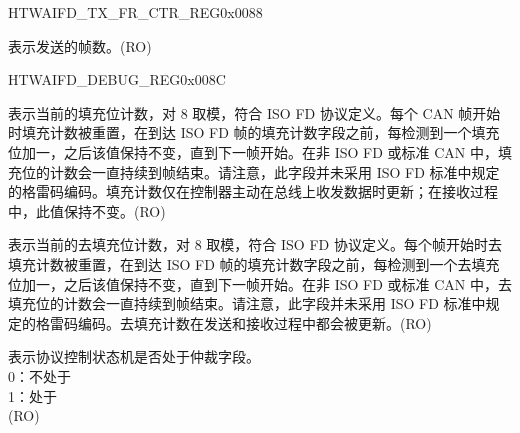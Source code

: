 \begin{register}{H}{TWAIFD\_TX\_FR\_CTR\_REG}{0x0088}\label{regdesc:TWAIFDTXFRCTRREG}
%
\regnewline%
\begin{regdesc}\begin{reglist}
\label{fielddesc:TWAIFDTXCTRVAL}\item [TWAIFD\_TX\_CTR\_VAL] 表示发送的帧数。(RO)
\end{reglist}\end{regdesc}
\end{register}


\begin{register}{H}{TWAIFD\_DEBUG\_REG}{0x008C}\label{regdesc:TWAIFDDEBUGREG}
%
%
%
%
%
%
%
%
%
%
%
%
%
%
%
%
\regnewline%
\begin{regdesc}\begin{reglist}
\label{fielddesc:TWAIFDSTUFFCOUNT}\item [TWAIFD\_STUFF\_COUNT] 表示当前的填充位计数，对 8 取模，符合 ISO FD 协议定义。每个 CAN 帧开始时填充计数被重置，在到达 ISO FD 帧的填充计数字段之前，每检测到一个填充位加一，之后该值保持不变，直到下一帧开始。在非 ISO FD 或标准 CAN 中，填充位的计数会一直持续到帧结束。请注意，此字段并未采用 ISO FD 标准中规定的格雷码编码。填充计数仅在控制器主动在总线上收发数据时更新；在接收过程中，此值保持不变。(RO)
\label{fielddesc:TWAIFDDESTUFFCOUNT}\item [TWAIFD\_DESTUFF\_COUNT] 表示当前的去填充位计数，对 8 取模，符合 ISO FD 协议定义。每个帧开始时去填充计数被重置，在到达 ISO FD 帧的填充计数字段之前，每检测到一个去填充位加一，之后该值保持不变，直到下一帧开始。在非 ISO FD 或标准 CAN 中，去填充位的计数会一直持续到帧结束。请注意，此字段并未采用 ISO FD 标准中规定的格雷码编码。去填充计数在发送和接收过程中都会被更新。(RO)
\label{fielddesc:TWAIFDPCARB}\item [TWAIFD\_PC\_ARB] 表示协议控制状态机是否处于仲裁字段。\\0：不处于\\1：处于\\(RO) 

\end{reglist}
\end{regdesc}
\end{register}
